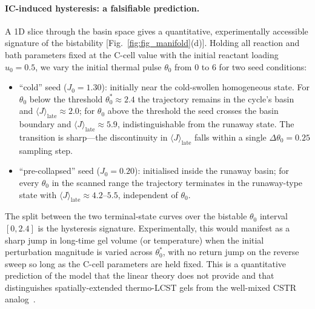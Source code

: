\documentclass[aps,pre,reprint,superscriptaddress,longbibliography,floatfix]{revtex4-2}
\begin{document}
\paragraph{IC-induced hysteresis: a falsifiable prediction.}
A 1D slice through the basin space gives a quantitative,
experimentally accessible signature of the bistability
[Fig.~\ref{fig:fig_manifold}(d)].  Holding all reaction and bath
parameters fixed at the C-cell value with the initial reactant
loading $u_0=0.5$, we vary the initial thermal pulse $\theta_0$
from $0$ to $6$ for two seed conditions:
\begin{itemize}
\item ``cold'' seed ($J_0=1.30$): initially near the cold-swollen
  homogeneous state.  For $\theta_0$ below the threshold
  $\theta_0^{\!*}\!\approx\!2.4$ the trajectory remains in the
  cycle's basin and
  $\langle J\rangle_\mathrm{late}\!\approx\!2.0$; for $\theta_0$
  above the threshold the seed crosses the basin boundary and
  $\langle J\rangle_\mathrm{late}\!\approx\!5.9$, indistinguishable
  from the runaway state.  The transition is sharp—the discontinuity
  in $\langle J\rangle_\mathrm{late}$ falls within a single
  $\Delta\theta_0=0.25$ sampling step.
\item ``pre-collapsed'' seed ($J_0=0.20$): initialised inside the
  runaway basin; for every $\theta_0$ in the scanned range the
  trajectory terminates in the runaway-type state with
  $\langle J\rangle_\mathrm{late}\!\approx\!4.2\text{--}5.5$,
  independent of $\theta_0$.
\end{itemize}
The split between the two terminal-state curves over the bistable
$\theta_0$ interval $[0, 2.4]$ is the hysteresis signature.
Experimentally, this would manifest as a sharp jump in long-time
gel volume (or temperature) when the initial perturbation magnitude
is varied across $\theta_0^{\!*}$, with no return jump on the
reverse sweep so long as the C-cell parameters are held fixed.
This is a quantitative prediction of the model that the linear
theory does not provide and that distinguishes spatially-extended
thermo-LCST gels from the well-mixed CSTR
analog~\cite{Uppal1974}.
\end{document}
